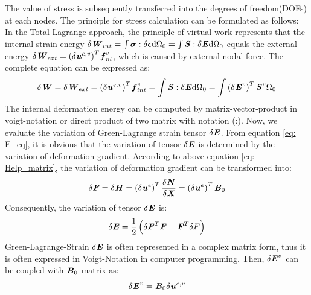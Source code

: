 The value of stress is subsequently transferred into the degrees of freedom(DOFs) at each nodes. The principle for stress calculation can be formulated as follows:\\
In the Total Lagrange approach, the principle of virtual work represents that the internal strain energy $\delta \textbf{\textit{W}}_{int} = \int \boldsymbol{\sigma} : \delta \boldsymbol{\epsilon} \mathrm{d}\Omega_0 = \int \textbf{\textit{S}} : \delta \textbf{\textit{E}} \mathrm{d}\Omega_0$ equals the external energy $\delta \textbf{\textit{W}}_{ext} = \left(\delta \textbf{\textit{u}}^{e,v}\right)^T \textbf{\textit{f}}_{nl}^v$, which is caused by external nodal force. The complete equation can be expressed as:
\begin{equation} \label{eq: W}
\delta \textbf{\textit{W}} = \delta \textbf{\textit{W}}_{ext} = \left(\delta \textbf{\textit{u}}^{e,v}\right)^T \textbf{\textit{f}}_{int}^v = \int \textbf{\textit{S}} : \delta \textbf{\textit{E}} \mathrm{d}\Omega_0 = \int \left( \delta \textbf{\textit{E}}^v\right)^T \textbf{\textit{S}}^v \mathrm{\Omega_0}
\end{equation}
The internal deformation energy can be computed by matrix-vector-product in voigt-notation or direct product of two matrix with notation (:). Now, we evaluate the variation of Green-Lagrange strain tensor $\delta \textbf{\textit{E}}$. From equation \ref{eq: E_eq}, it is obvious that the variation of tensor $\delta \textbf{\textit{E}}$ is determined by the variation of deformation gradient. According to above equation \ref{eq: Help_matrix}, the variation of deformation gradient can be transformed into:
\begin{equation}
\delta \textbf{\textit{F}} = \delta \textbf{\textit{H}} = \left(\delta \textbf{\textit{u}}^e\right)^T \frac{\delta \textbf{\textit{N}}}{\delta \textbf{\textit{X}}} = \left(\delta \textbf{\textit{u}}^e\right)^T \tilde{\textbf{\textit{B}}_0}
\end{equation}
Consequently, the variation of tensor $\delta \textbf{\textit{E}}$ is:
\begin{equation}
\delta \textbf{\textit{E}} = \frac{1}{2} \left(\delta \textbf{\textit{F}}^T \textbf{\textit{F}} + \textbf{\textit{F}}^T \delta F \right)
\end{equation}
Green-Lagrange-Strain $\delta \textbf{\textit{E}}$ is often represented in a complex matrix form, thus it is often expressed in Voigt-Notation in computer programming. Then, $\delta \textbf{\textit{E}}^v$ can be coupled with $\textbf{\textit{B}}_0$-matrix as:
\begin{equation} \label{eq: E_voigt}
\delta \textbf{\textit{E}}^v = \textbf{\textit{B}}_0 \delta \textbf{\textit{u}}^{e,v}
\end{equation} 
